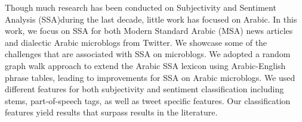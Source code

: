 Though much research has been conducted on Subjectivity and Sentiment Analysis (SSA)during the last decade, little work has focused on Arabic. In this work,
 we focus on SSA for both Modern Standard Arabic (MSA) news articles and
 dialectic Arabic microblogs from Twitter. We showcase some of the challenges
 that are associated with SSA on microblogs. We adopted a random graph walk
 approach to extend the Arabic SSA lexicon using Arabic-English phrase tables,
 leading to improvements for SSA on Arabic microblogs. We used different
 features for both subjectivity and sentiment classification including stems,
 part-of-speech tags, as well as tweet specific features. Our classification
 features yield results that surpass results in the literature.

